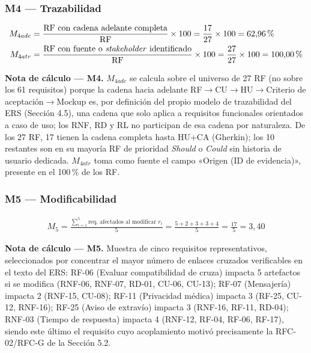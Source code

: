 \documentclass[journal,onecolumn]{IEEEtran}
\begin{document}
\subsubsection*{M4 --- Trazabilidad}

{\setlength{\jot}{8pt}
	\begin{align*}
		M_{4ade} &= \frac{\text{RF con cadena adelante completa}}{\text{RF}} \times 100 = \frac{17}{27} \times 100 = 62{,}96\,\% \\
		M_{4atr} &= \frac{\text{RF con fuente o \textit{stakeholder} identificado}}{\text{RF}} \times 100 = \frac{27}{27} \times 100 = 100{,}00\,\%
\end{align*}}

\textbf{Nota de cálculo --- M4.} $M_{4ade}$ se calcula sobre el universo de 27 RF (no sobre los 61 requisitos) porque la cadena hacia adelante RF$\rightarrow$CU$\rightarrow$HU$\rightarrow$Criterio de aceptación$\rightarrow$Mockup es, por definición del propio modelo de trazabilidad del ERS (Sección 4.5), una cadena que solo aplica a requisitos funcionales orientados a caso de uso; los RNF, RD y RL no participan de esa cadena por naturaleza. De los 27 RF, 17 tienen la cadena completa hasta HU+CA (Gherkin); los 10 restantes son en su mayoría RF de prioridad \emph{Should} o \emph{Could} sin historia de usuario dedicada. $M_{4atr}$ toma como fuente el campo «Origen (ID de evidencia)», presente en el 100\,\% de los RF.

\subsubsection*{M5 --- Modificabilidad}

{\setlength{\jot}{8pt}
	\begin{align*}
		M_5 = \frac{\sum_{i=1}^{5} \text{req. afectados al modificar } r_i}{5} = \frac{5+2+3+3+4}{5} = \frac{17}{5} = 3{,}40
\end{align*}}

\textbf{Nota de cálculo --- M5.} Muestra de cinco requisitos representativos, seleccionados por concentrar el mayor número de enlaces cruzados verificables en el texto del ERS: RF-06 (Evaluar compatibilidad de cruza) impacta 5 artefactos si se modifica (RNF-06, RNF-07, RD-01, CU-06, CU-13); RF-07 (Mensajería) impacta 2 (RNF-15, CU-08); RF-11 (Privacidad médica) impacta 3 (RF-25, CU-12, RNF-16); RF-25 (Aviso de extravío) impacta 3 (RNF-16, RF-11, RD-04); RNF-03 (Tiempo de respuesta) impacta 4 (RNF-12, RF-04, RF-06, RF-17), siendo este último el requisito cuyo acoplamiento motivó precisamente la RFC-02/RFC-G de la Sección 5.2.
\end{document}
